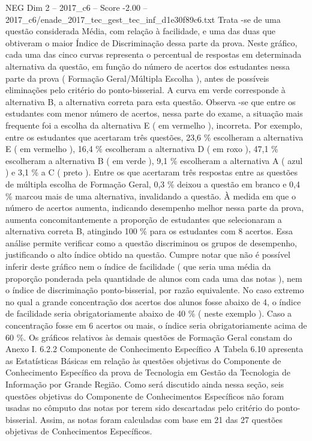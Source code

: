 \begin{textsample}{NEG Dim 2 – 2017\_c6 – Score -2.00 – 2017\_c6/enade\_2017\_tec\_gest\_tec\_inf\_d1e30f89c6.txt}
Trata -se de uma questão considerada Média, com relação à facilidade, e uma das duas que obtiveram o maior Índice de Discriminação dessa parte da prova.
Neste gráfico, cada uma das cinco curvas representa o percentual de respostas em determinada alternativa da questão, em função do número de acertos dos estudantes nessa parte da prova ( Formação Geral/Múltipla Escolha ), antes de possíveis eliminações pelo critério do ponto-bisserial.
A curva em verde corresponde à alternativa B, a alternativa correta para esta questão.
Observa -se que entre os estudantes com menor número de acertos, nessa parte do exame, a situação mais frequente foi a escolha da alternativa E ( em vermelho ), incorreta.
Por exemplo, entre os estudantes que acertaram três questões, 23,6 \% escolheram a alternativa E ( em vermelho ), 16,4 \% escolheram a alternativa D ( em roxo ), 47,1 \% escolheram a alternativa B ( em verde ), 9,1 \% escolheram a alternativa A ( azul ) e 3,1 \% a C ( preto ).
Entre os que acertaram três respostas entre as questões de múltipla escolha de Formação Geral, 0,3 \% deixou a questão em branco e 0,4 \% marcou mais de uma alternativa, invalidando a questão.
À medida em que o número de acertos aumenta, indicando desempenho melhor nessa parte da prova, aumenta concomitantemente a proporção de estudantes que selecionaram a alternativa correta B, atingindo 100 \% para os estudantes com 8 acertos.
Essa análise permite verificar como a questão discriminou os grupos de desempenho, justificando o alto índice obtido na questão.
Cumpre notar que não é possível inferir deste gráfico nem o índice de facilidade ( que seria uma média da proporção ponderada pela quantidade de alunos com cada uma das notas ), nem o índice de discriminação ponto-bisserial, por razão equivalente.
No caso extremo no qual a grande concentração dos acertos dos alunos fosse abaixo de 4, o índice de facilidade seria obrigatoriamente abaixo de 40 \% ( neste exemplo ).
Caso a concentração fosse em 6 acertos ou mais, o índice seria obrigatoriamente acima de 60 \%.
Os gráficos relativos às demais questões de Formação Geral constam do Anexo I. 6.2.2 Componente de Conhecimento Específico A Tabela 6.10 apresenta as Estatísticas Básicas em relação às questões objetivas do Componente de Conhecimento Específico da prova de Tecnologia em Gestão da Tecnologia de Informação por Grande Região.
Como será discutido ainda nessa seção, seis questões objetivas do Componente de Conhecimentos Específicos não foram usadas no cômputo das notas por terem sido descartadas pelo critério do ponto-bisserial.
Assim, as notas foram calculadas com base em 21 das 27 questões objetivas de Conhecimentos Específicos.

\end{textsample}
